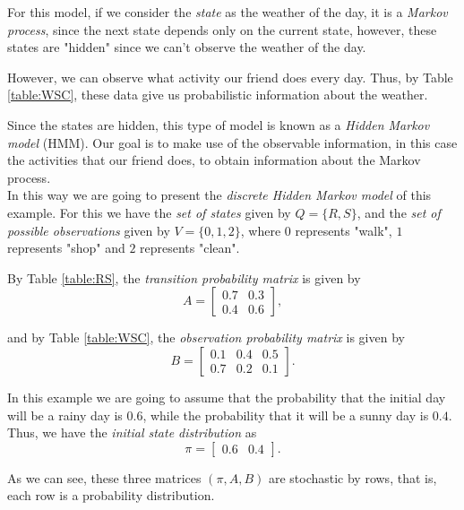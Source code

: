 \documentclass[12pt]{article}
\numberwithin{equation}{section}
\begin{document}
For this model, if we consider the \emph{state} as the weather of the day, it is a \emph{Markov process}, since the next state depends only on the current state, however, these states are "hidden" since we can’t observe the weather of the day.

However, we can observe what activity our friend does every day. Thus, by Table \ref{table:WSC}, these data give us probabilistic information about the weather.

Since the states are hidden, this type of model is known as a \emph{Hidden Markov model} (HMM). Our goal is to make use of the observable information, in this case the activities that our friend does, to obtain information about the Markov process.\\

In this way we are going to present the \emph{discrete Hidden Markov model} of this example. For this we have the \emph{set of states} given by $Q = \{R, S\}$, and the \emph{set of possible observations} given by $V = \{0, 1, 2\}$, where $0$ represents "walk", $1$ represents "shop" and $2$ represents "clean".

By Table \ref{table:RS}, the \emph{transition probability matrix} is given by
\begin{equation}\label{matrixA}
A = 
\begin{bmatrix}
0.7 & 0.3\\
0.4 & 0.6
\end{bmatrix},
\end{equation}

and by Table \ref{table:WSC}, the \emph{observation probability matrix} is given by
\begin{equation}\label{matrixB}
B = 
\begin{bmatrix}
0.1 & 0.4 & 0.5\\
0.7 & 0.2 & 0.1
\end{bmatrix}.
\end{equation}

In this example we are going to assume that the probability that the initial day will be a rainy day is $0.6$, while the probability that it will be a sunny day is $0.4$. Thus, we have the \emph{initial state distribution} as
\begin{equation}\label{matrixPi}
\pi = 
\begin{bmatrix}
0.6 & 0.4
\end{bmatrix}.
\end{equation}

As we can see, these three matrices $(\pi, A, B)$ are stochastic by rows, that is, each row is a probability distribution.
\end{document}
